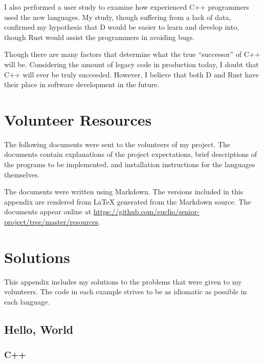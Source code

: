 \documentclass[finalcopy]{srpaper}
\begin{document}
I also performed a user study to examine how experienced C++ programmers
used the new languages. My study, though suffering from a lack of data,
confirmed my hypothesis that D would be easier to learn and develop into,
though Rust would assist the programmers in avoiding bugs.

Though there are many factors that determine what the true ``successor'' of
C++ will be. Considering the amount of legacy code in production today, I
doubt that C++ will ever be truly succeeded. However, I believe that both D
and Rust have their place in software development in the future.

\nocite{*}


\appendix
\chapter{Volunteer Resources}\label{app:resources}
The following documents were sent to the volunteers of my project. The
documents contain explanations of the project expectations, brief descriptions
of the programs to be implemented, and installation instructions for the
languages themselves.

The documents were written using Markdown. The versions included in this
appendix are rendered from \LaTeX{} generated from the Markdown source. The
documents appear online at
\url{https://github.com/euclio/senior-project/tree/master/resources}.

\clearpage

\clearpage

\clearpage


\chapter{Solutions}\label{app:solutions}
This appendix includes my solutions to the problems that were given to my
volunteers. The code in each example strives to be as idiomatic as possible in
each language.


\section{Hello, World}
\subsection{C++}
\begin{mdframed}[linecolor=black]
\inputminted{cpp}{../examples/hello-world/hello_world.cpp}
\end{mdframed}
\end{document}
